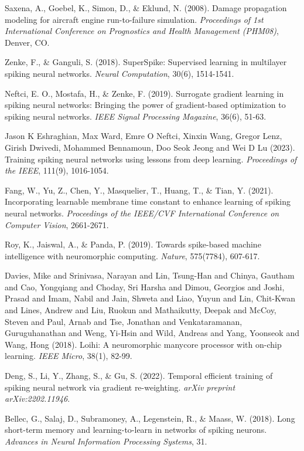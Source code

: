 \documentclass[11pt]{article}
\begin{document}

\begin{thebibliography}{9}

Saxena, A., Goebel, K., Simon, D., \& Eklund, N. (2008).
Damage propagation modeling for aircraft engine run-to-failure simulation.
\textit{Proceedings of 1st International Conference on Prognostics and Health Management (PHM08)}, Denver, CO.

Zenke, F., \& Ganguli, S. (2018).
SuperSpike: Supervised learning in multilayer spiking neural networks.
\textit{Neural Computation}, 30(6), 1514-1541.

Neftci, E. O., Mostafa, H., \& Zenke, F. (2019).
Surrogate gradient learning in spiking neural networks: Bringing the power of gradient-based optimization to spiking neural networks.
\textit{IEEE Signal Processing Magazine}, 36(6), 51-63.

Jason K Eshraghian, Max Ward, Emre O Neftci, Xinxin Wang, Gregor Lenz, Girish Dwivedi, Mohammed Bennamoun, Doo Seok Jeong and Wei D Lu (2023).
Training spiking neural networks using lessons from deep learning.
\textit{Proceedings of the IEEE}, 111(9), 1016-1054.

Fang, W., Yu, Z., Chen, Y., Masquelier, T., Huang, T., \& Tian, Y. (2021).
Incorporating learnable membrane time constant to enhance learning of spiking neural networks.
\textit{Proceedings of the IEEE/CVF International Conference on Computer Vision}, 2661-2671.

Roy, K., Jaiswal, A., \& Panda, P. (2019).
Towards spike-based machine intelligence with neuromorphic computing.
\textit{Nature}, 575(7784), 607-617.

Davies, Mike and Srinivasa, Narayan and Lin, Tsung-Han and Chinya, Gautham and Cao, Yongqiang and Choday, Sri Harsha and Dimou, Georgios and Joshi, Prasad and Imam, Nabil and Jain, Shweta and Liao, Yuyun and Lin, Chit-Kwan and Lines, Andrew and Liu, Ruokun and Mathaikutty, Deepak and McCoy, Steven and Paul, Arnab and Tse, Jonathan and Venkataramanan, Guruguhanathan and Weng, Yi-Hsin and Wild, Andreas and Yang, Yoonseok and Wang, Hong (2018).
Loihi: A neuromorphic manycore processor with on-chip learning.
\textit{IEEE Micro}, 38(1), 82-99.

Deng, S., Li, Y., Zhang, S., \& Gu, S. (2022).
Temporal efficient training of spiking neural network via gradient re-weighting.
\textit{arXiv preprint arXiv:2202.11946}.

Bellec, G., Salaj, D., Subramoney, A., Legenstein, R., \& Maass, W. (2018).
Long short-term memory and learning-to-learn in networks of spiking neurons.
\textit{Advances in Neural Information Processing Systems}, 31.

\end{thebibliography}
\end{document}
